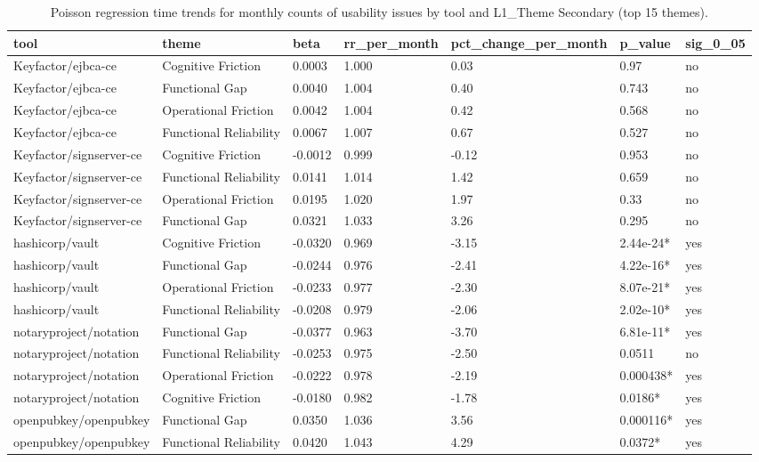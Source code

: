 \begin{table}[t]
\centering
\caption{Poisson regression time trends for monthly counts of usability issues by tool and L1_Theme Secondary (top 15 themes).}
\label{tab:poisson-l1_theme_secondary}
\scriptsize
\begin{tabular}{lllllll}
\hline
tool & theme & beta & rr\_per\_month & pct\_change\_per\_month & p\_value & sig\_0\_05 \\
\hline
Keyfactor/ejbca-ce & Cognitive Friction & 0.0003 & 1.000 & 0.03 & 0.97 & no \\
Keyfactor/ejbca-ce & Functional Gap & 0.0040 & 1.004 & 0.40 & 0.743 & no \\
Keyfactor/ejbca-ce & Operational Friction & 0.0042 & 1.004 & 0.42 & 0.568 & no \\
Keyfactor/ejbca-ce & Functional Reliability & 0.0067 & 1.007 & 0.67 & 0.527 & no \\
Keyfactor/signserver-ce & Cognitive Friction & -0.0012 & 0.999 & -0.12 & 0.953 & no \\
Keyfactor/signserver-ce & Functional Reliability & 0.0141 & 1.014 & 1.42 & 0.659 & no \\
Keyfactor/signserver-ce & Operational Friction & 0.0195 & 1.020 & 1.97 & 0.33 & no \\
Keyfactor/signserver-ce & Functional Gap & 0.0321 & 1.033 & 3.26 & 0.295 & no \\
hashicorp/vault & Cognitive Friction & -0.0320 & 0.969 & -3.15 & 2.44e-24* & yes \\
hashicorp/vault & Functional Gap & -0.0244 & 0.976 & -2.41 & 4.22e-16* & yes \\
hashicorp/vault & Operational Friction & -0.0233 & 0.977 & -2.30 & 8.07e-21* & yes \\
hashicorp/vault & Functional Reliability & -0.0208 & 0.979 & -2.06 & 2.02e-10* & yes \\
notaryproject/notation & Functional Gap & -0.0377 & 0.963 & -3.70 & 6.81e-11* & yes \\
notaryproject/notation & Functional Reliability & -0.0253 & 0.975 & -2.50 & 0.0511 & no \\
notaryproject/notation & Operational Friction & -0.0222 & 0.978 & -2.19 & 0.000438* & yes \\
notaryproject/notation & Cognitive Friction & -0.0180 & 0.982 & -1.78 & 0.0186* & yes \\
openpubkey/openpubkey & Functional Gap & 0.0350 & 1.036 & 3.56 & 0.000116* & yes \\
openpubkey/openpubkey & Functional Reliability & 0.0420 & 1.043 & 4.29 & 0.0372* & yes \\

\end{tabular}
\end{table}
